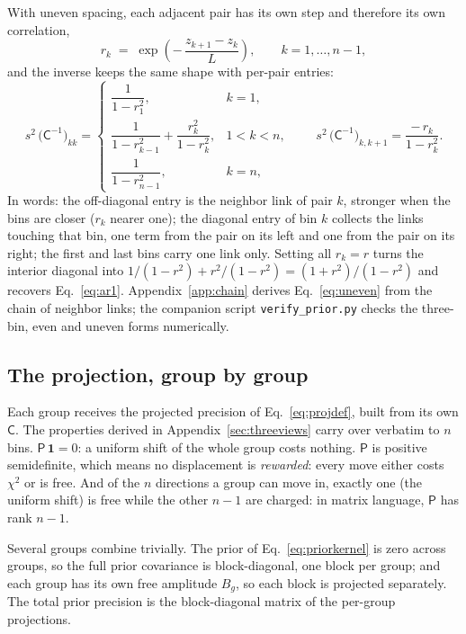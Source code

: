 \documentclass[11pt]{article}
\newcommand{\ones}{\mathbf{1}} %
\newcommand{\Cov}{\mathsf{C}}
\newcommand{\Prec}{\mathsf{P}}
\begin{document}
With uneven spacing, each adjacent pair has its own step and therefore
its own correlation,
\begin{equation}
  r_k \;=\; \exp\!\left(-\,\frac{z_{k+1} - z_k}{L}\right),
  \qquad k = 1, \dots, n-1 ,
  \label{eq:rk}
\end{equation}
and the inverse keeps the same shape with per-pair entries:
\begin{equation}
  s^2\,\bigl(\Cov^{-1}\bigr)_{kk} =
  \begin{cases}
    \dfrac{1}{1 - r_1^2}, & k = 1,\\[2.2ex]
    \dfrac{1}{1 - r_{k-1}^2} + \dfrac{r_k^2}{1 - r_k^2}, & 1 < k < n,\\[2.2ex]
    \dfrac{1}{1 - r_{n-1}^2}, & k = n,
  \end{cases}
  \qquad
  s^2\,\bigl(\Cov^{-1}\bigr)_{k, k+1} = \frac{-\,r_k}{1 - r_k^2}.
  \label{eq:uneven}
\end{equation}
In words: the off-diagonal entry is the neighbor link of pair $k$,
stronger when the bins are closer ($r_k$ nearer one); the diagonal
entry of bin $k$ collects the links touching that bin, one term from
the pair on its left and one from the pair on its right; the first and
last bins carry one link only.  Setting all $r_k = r$ turns the
interior diagonal into
$1/(1-r^2) + r^2/(1-r^2) = (1+r^2)/(1-r^2)$ and recovers
Eq.~\eqref{eq:ar1}.  Appendix~\ref{app:chain} derives
Eq.~\eqref{eq:uneven} from the chain of neighbor links; the companion
script \texttt{verify\_prior.py} checks the three-bin, even and uneven
forms numerically.

\subsection{The projection, group by group}
\label{sec:projgroups}

Each group receives the projected precision of Eq.~\eqref{eq:projdef},
built from its own $\Cov$.  The properties derived in
Appendix~\ref{sec:threeviews} carry over verbatim to $n$ bins.
$\Prec\,\ones = 0$: a uniform shift of the whole group costs nothing.
$\Prec$ is positive semidefinite, which means no displacement is
\emph{rewarded}: every move either costs $\chi^2$ or is free.  And of
the $n$ directions a group can move in, exactly one (the uniform shift)
is free while the other $n - 1$ are charged: in matrix language,
$\Prec$ has rank $n - 1$.

Several groups combine trivially.  The prior of
Eq.~\eqref{eq:priorkernel} is zero across groups, so the full prior
covariance is block-diagonal, one block per group; and each group has
its own free amplitude $B_g$, so each block is projected separately.
The total prior precision is the block-diagonal matrix of the per-group
projections.
\end{document}
